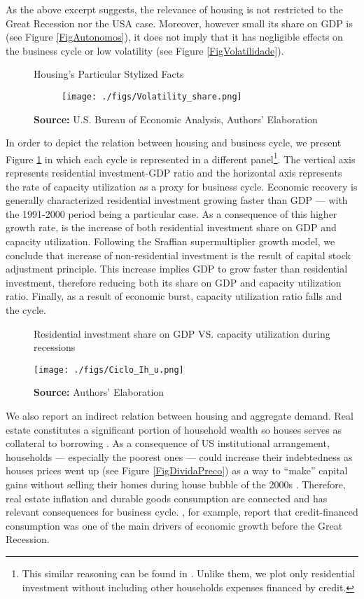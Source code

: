 \documentclass[11pt]{article}
\begin{document}
As the above excerpt suggests, the relevance of housing is not restricted to the Great Recession nor the USA case.
Moreover, however small its share on GDP is (see Figure \ref{FigAutonomos}), it does not imply that it has negligible effects on the business cycle or low volatility (see Figure \ref{FigVolatilidade}).

\begin{figure}[H]
    \centering
	\caption{Housing's Particular Stylized Facts}
	\label{fig:vol+share}
\begin{figure}[htb]
    \texttt{[image: ./figs/Volatility\_share.png]}
    \end{figure}
	\caption*{\textbf{Source:} U.S. Bureau of Economic Analysis, Authors' Elaboration}
\end{figure}



In order to depict the relation between housing and business cycle, we present Figure \ref{FigIh_u}  in which each cycle is represented in a different panel\footnote{This similar reasoning can be found in \textcites{fiebiger_trend_2017}. Unlike them, we plot only residential investment without including other households expenses financed by credit.}. 
The vertical axis represents residential investment-GDP ratio and the horizontal
axis represents the rate of capacity utilization as a proxy for business cycle.
Economic recovery is generally characterized residential investment growing faster than GDP --- with the 1991-2000 period being a particular case. 
As a consequence of this higher growth rate, is the increase of both residential investment share on GDP and capacity utilization. 
Following the Sraffian supermultiplier growth model, we conclude that increase of non-residential investment is the result of capital stock adjustment principle.
This increase implies GDP to grow faster than residential investment, therefore reducing both its share on GDP and capacity utilization ratio. 
Finally, as a result of economic burst, capacity utilization ratio falls and the cycle.

\begin{figure}[H]
	\centering
	\caption{Residential investment share on GDP VS. capacity utilization during recessions}
	\label{FigIh_u}
	\texttt{[image: ./figs/Ciclo\_Ih\_u.png]}
	\caption*{\textbf{Source:} Authors' Elaboration}
\end{figure}

We also report an indirect relation between housing and aggregate demand. 
Real estate constitutes a significant portion of household wealth so houses serves as collateral to borrowing \cite{teixeira_uma_2011}. 
As a consequence of US institutional arrangement, households --- especially the poorest ones --- could increase their indebtedness as houses prices went up (see Figure \ref{FigDividaPreco}) as a way to ``make'' capital gains without 
selling their homes during house bubble of the 2000s \cite{teixeira_crescimento_2015}.
Therefore, real estate inflation and durable goods consumption are connected and has relevant consequences for business cycle.
\textcites{zezza_u.s._2008}{barba_rising_2009}, for example, report that credit-financed consumption was one of the main drivers of economic growth before the Great Recession.
\end{document}
